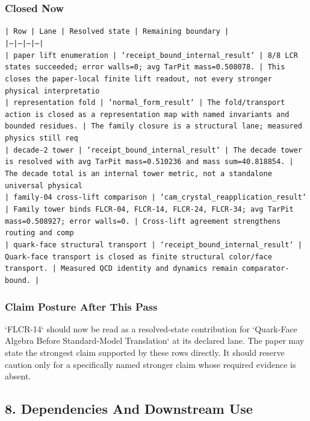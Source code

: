 \documentclass[11pt]{article}
\begin{document}
\subsubsection*{Closed Now}

\noindent\texttt{| Row | Lane | Resolved state | Remaining boundary |}\\
\noindent\texttt{|---|---|---|---|}\\
\noindent\texttt{| paper lift enumeration | `receipt\_bound\_internal\_result` | 8/8 LCR states succeeded; error walls=0; avg TarPit mass=0.508078. | This closes the paper-local finite lift readout, not every stronger physical interpretatio}\\
\noindent\texttt{| representation fold | `normal\_form\_result` | The fold/transport action is closed as a representation map with named invariants and bounded residues. | The family closure is a structural lane; measured physics still req}\\
\noindent\texttt{| decade-2 tower | `receipt\_bound\_internal\_result` | The decade tower is resolved with avg TarPit mass=0.510236 and mass sum=40.818854. | The decade total is an internal tower metric, not a standalone universal physical }\\
\noindent\texttt{| family-04 cross-lift comparison | `cam\_crystal\_reapplication\_result` | Family tower binds FLCR-04, FLCR-14, FLCR-24, FLCR-34; avg TarPit mass=0.508927; error walls=0. | Cross-lift agreement strengthens routing and comp}\\
\noindent\texttt{| quark-face structural transport | `receipt\_bound\_internal\_result` | Quark-face transport is closed as finite structural color/face transport. | Measured QCD identity and dynamics remain comparator-bound. |}\\

\subsubsection*{Claim Posture After This Pass}

`FLCR-14` should now be read as a resolved-state contribution for `Quark-Face Algebra Before Standard-Model Translation` at its declared lane. The paper may state the strongest claim supported by these rows directly. It should reserve caution only for a specifically named stronger claim whose required evidence is absent.

\subsection*{8. Dependencies And Downstream Use}
\end{document}
